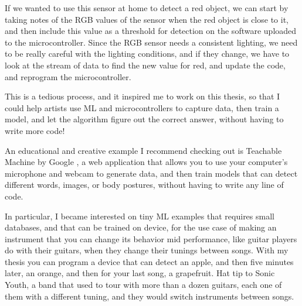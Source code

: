 If we wanted to use this sensor at home to detect a red object, we can start by taking notes of the \acrshort{RGB} values of the sensor when the red object is close to it, and then include this value as a threshold for detection on the software uploaded to the microcontroller. Since the \acrshort{RGB} sensor needs a consistent lighting, we need to be really careful with the lighting conditions, and if they change, we have to look at the stream of data to find the new value for red, and update the code, and reprogram the microcontroller.

This is a tedious process, and it inspired me to work on this thesis, so that I could help artists use \acrshort{ML} and microcontrollers to capture data, then train a model, and let the algorithm figure out the correct answer, without having to write more code!

An educational and creative example I recommend checking out is Teachable Machine by Google \cite{website-google-teachable-machine}, a web application that allows you to use your computer's microphone and webcam to generate data, and then train models that can detect different words, images, or body postures, without having to write any line of code.

In particular, I became interested on tiny \acrshort{ML} examples that requires small databases, and that can be trained on device, for the use case of making an instrument that you can change its behavior mid performance, like guitar players do with their guitars, when they change their tunings between songs. With my thesis you can program a device that can detect an apple, and then five minutes later, an orange, and then for your last song, a grapefruit. Hat tip to Sonic Youth, a band that used to tour with more than a dozen guitars, each one of them with a different tuning, and they would switch instruments between songs.

